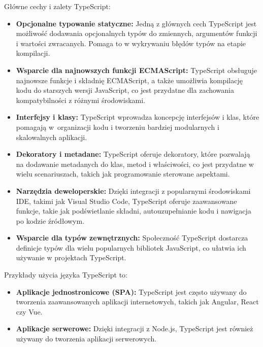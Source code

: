 Główne cechy i zalety TypeScript:
\begin{itemize}
\item \textbf{Opcjonalne typowanie statyczne:} Jedną z głównych cech TypeScript jest możliwość dodawania opcjonalnych typów do zmiennych, argumentów funkcji i wartości zwracanych. Pomaga to w wykrywaniu błędów typów na etapie kompilacji.

\item \textbf{Wsparcie dla najnowszych funkcji ECMAScript:} TypeScript obsługuje najnowsze funkcje i składnię ECMAScript, a także umożliwia kompilację kodu do starszych wersji JavaScript, co jest przydatne dla zachowania kompatybilności z różnymi środowiskami.

\item \textbf{Interfejsy i klasy:} TypeScript wprowadza koncepcję interfejsów i klas, które pomagają w~organizacji kodu i tworzeniu bardziej modularnych i skalowalnych aplikacji.

\item \textbf{Dekoratory i metadane:} TypeScript oferuje dekoratory, które pozwalają na dodawanie metadanych do klas, metod i właściwości, co jest przydatne w wielu scenariuszach, takich jak programowanie sterowane aspektami.

\item \textbf{Narzędzia deweloperskie:} Dzięki integracji z popularnymi środowiskami IDE, takimi jak Visual Studio Code, TypeScript oferuje zaawansowane funkcje, takie jak podświetlanie składni, autouzupełnianie kodu i nawigacja po kodzie źródłowym.

\item \textbf{Wsparcie dla typów zewnętrznych:} Społeczność TypeScript dostarcza definicje typów dla wielu popularnych bibliotek JavaScript, co ułatwia ich używanie w projektach TypeScript.
\end{itemize}

Przykłady użycia języka TypeScript to:

\begin{itemize}
\item \textbf{Aplikacje jednostronicowe (SPA):} TypeScript jest często używany do tworzenia zaawansowanych aplikacji internetowych, takich jak Angular, React czy Vue.

\item \textbf{Aplikacje serwerowe:} Dzięki integracji z Node.js, TypeScript jest również używany do tworzenia aplikacji serwerowych.
\end{itemize}

